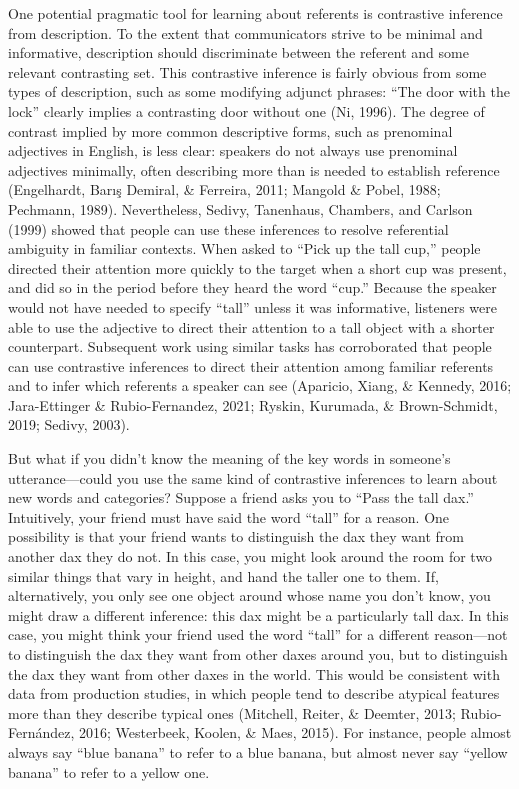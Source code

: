 \documentclass[
  english,
  man,floatsintext]{apa6}
\begin{document}
One potential pragmatic tool for learning about referents is contrastive inference from description. To the extent that communicators strive to be minimal and informative, description should discriminate between the referent and some relevant contrasting set. This contrastive inference is fairly obvious from some types of description, such as some modifying adjunct phrases: ``The door with the lock'' clearly implies a contrasting door without one (Ni, 1996). The degree of contrast implied by more common descriptive forms, such as prenominal adjectives in English, is less clear: speakers do not always use prenominal adjectives minimally, often describing more than is needed to establish reference (Engelhardt, Barış Demiral, \& Ferreira, 2011; Mangold \& Pobel, 1988; Pechmann, 1989). Nevertheless, Sedivy, Tanenhaus, Chambers, and Carlson (1999) showed that people can use these inferences to resolve referential ambiguity in familiar contexts. When asked to ``Pick up the tall cup,'' people directed their attention more quickly to the target when a short cup was present, and did so in the period before they heard the word ``cup.'' Because the speaker would not have needed to specify ``tall'' unless it was informative, listeners were able to use the adjective to direct their attention to a tall object with a shorter counterpart. Subsequent work using similar tasks has corroborated that people can use contrastive inferences to direct their attention among familiar referents and to infer which referents a speaker can see (Aparicio, Xiang, \& Kennedy, 2016; Jara-Ettinger \& Rubio-Fernandez, 2021; Ryskin, Kurumada, \& Brown-Schmidt, 2019; Sedivy, 2003).

But what if you didn't know the meaning of the key words in someone's utterance---could you use the same kind of contrastive inferences to learn about new words and categories? Suppose a friend asks you to ``Pass the tall dax.'' Intuitively, your friend must have said the word ``tall'' for a reason. One possibility is that your friend wants to distinguish the dax they want from another dax they do not. In this case, you might look around the room for two similar things that vary in height, and hand the taller one to them. If, alternatively, you only see one object around whose name you don't know, you might draw a different inference: this dax might be a particularly tall dax. In this case, you might think your friend used the word ``tall'' for a different reason---not to distinguish the dax they want from other daxes around you, but to distinguish the dax they want from other daxes in the world. This would be consistent with data from production studies, in which people tend to describe atypical features more than they describe typical ones (Mitchell, Reiter, \& Deemter, 2013; Rubio-Fernández, 2016; Westerbeek, Koolen, \& Maes, 2015). For instance, people almost always say ``blue banana'' to refer to a blue banana, but almost never say ``yellow banana'' to refer to a yellow one.
\end{document}
